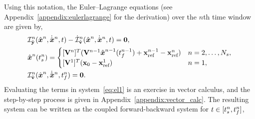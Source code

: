 Using this notation, the Euler--Lagrange equations (see
Appendix~\ref{appendix:eulerlagrange} for the derivation) over the $n$th
time window are given by, 
\begin{equation}\label{eq:el1} 
\begin{split}
& \dIdYArg{n}(\genstateArgnt{n},\genstateDotArgnt{n},t) - \dIdVDotArg{n}(\genstateArgnt{n},\genstateDotArgnt{n}, t )  = \bz, \\ 
&\genstate^n(\timeStartArg{n})  = \begin{cases} 
\spatialIC &
n=2,\ldots,\nslabs, \\ 
\genstateICOne & n=1,
\end{cases}\\ 
&\dIdVArg{n}(\genstateArgnt{n},\genstateDotArgnt{n},\timeEndArg{n})  = \bz.
\end{split} 
\end{equation}
Evaluating the terms in system~\eqref{eq:el1} is an exercise in
vector calculus, and the step-by-step process is given in
Appendix~\ref{appendix:vector_calc}. The resulting system can be written as the 
coupled forward-backward system for $t \in [t_s^{n},t_f^{n} ]$,
